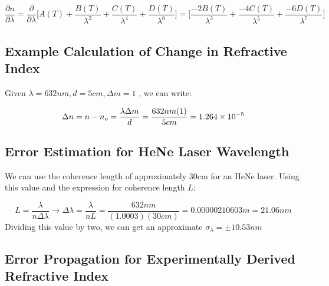 \documentclass{article}
\begin{document}
\begin{equation}
\dfrac{\partial{n}}{\partial{\lambda}} = 
    \dfrac{\partial}{\partial{\lambda}}\bigg[   A(T) + \dfrac{B(T)}{\lambda^2}  + \dfrac{C(T)}{\lambda^4}   + \dfrac{D(T)}{\lambda^6}\bigg] =
    \bigg[   \dfrac{-2B(T)}{\lambda^3}  + \dfrac{-4C(T)}{\lambda^5}   + \dfrac{-6D(T)}{\lambda^7}\bigg]
\end{equation}
\subsection{  Example Calculation of Change in Refractive Index }\label{sec:example_calculation_of_change_in_refractive_index }\label{subsec:_example_calculation_of_change_in_refractive_index_}\label{sec:example_calculation_of_change_in_refractive_index}

Given $\lambda = 632nm, d = 5cm, \Delta{m} = 1$ , we can write:


\begin{equation}
	\Delta{n} =  n - n_o=\frac{\lambda\Delta{m}}{d} = \frac{632nm(1)}{5cm} = \num{1.264d-5}
\end{equation}



\clearpage

\subsection{  Error Estimation for HeNe Laser Wavelength}\label{app:wavelength_error_estimate }\label{sec:error_estimation_for_hene_laser_wavelength}\label{app:wavelength_error_estimate }\label{subsec:_error_estimation_for_hene_laser_wavelength}\label{app:wavelength_error_estimate_}\label{sec:error_estimation_for_hene_laser_wavelength}\label{app:wavelength_error_estimate}
We can use the coherence length of approximately 30cm for an HeNe laser. Using this value and the expression for coherence length $L$:

\begin{equation}
	L = \frac{\lambda}{n\Delta\lambda} \rightarrow \Delta\lambda = \frac{\lambda}{nL} = \frac{632nm}{(1.0003)(30cm)} = 0.00000210603m = 21.06nm
\end{equation}Dividing this value by two, we can get an approximate $\sigma_\lambda = \pm 10.53nm$ 




\subsection{  Error Propagation for Experimentally Derived Refractive Index }\label{sec:error_propagation_for_experimentally_derived_refractive_index }\label{subsec:_error_propagation_for_experimentally_derived_refractive_index_}\label{sec:error_propagation_for_experimentally_derived_refractive_index}
\end{document}
